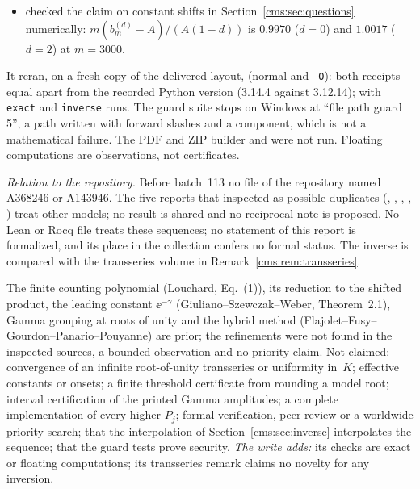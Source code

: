 \begin{writenote}
\begin{itemize}
residual tends to $-1$) and~\eqref{cms:eq:displacement} for the model $B_3$
($(r_3-X-\frac12)X\log X\to\frac1{24}$), and the monotone quadratic convergence
of~\eqref{cms:eq:Newton}, at $\log y=10^3,10^5,10^8$;
\item checked the claim on constant shifts in Section~\ref{cms:sec:questions}
numerically: $m(b^{(d)}_m-A)/(A(1-d))$ is $0.9970$ ($d=0$) and $1.0017$
($d=2$) at $m=3000$.
\end{itemize}
It reran, on a fresh copy of the delivered layout,  (normal
and \texttt{-O}): both receipts equal  apart from the
recorded Python version (3.14.4 against 3.12.14);  with
\texttt{exact} and \texttt{inverse} runs. The guard suite  stops on Windows
at ``file path guard 5'', a path written with forward slashes and a
 component, which is not a mathematical failure. The PDF and ZIP
builder and  were not run. Floating computations are
observations, not certificates.

\emph{Relation to the repository.} Before batch~113 no file of the repository
named A368246 or A143946. The five reports that  inspected as
possible duplicates (,
,
,
,
) treat other models; no result is
shared and no reciprocal note is proposed. No Lean or Rocq file treats these
sequences; no statement of this report is formalized, and its place in the
collection confers no formal status. The inverse is compared with the
transseries volume in Remark~\ref{cms:rem:transseries}.
\end{writenote}
\begin{writenote}
The finite counting polynomial (Louchard, Eq.~(1)), its reduction to the
shifted product, the leading constant $\ee^{-\gamma}$ (Giuliano--Szewczak--Weber,
Theorem~2.1), Gamma grouping at roots of unity and the hybrid method
(Flajolet--Fusy--Gourdon--Panario--Pouyanne) are prior; the refinements were
not found in the inspected sources, a bounded observation and no priority
claim. Not claimed: convergence of an infinite root-of-unity transseries or
uniformity in~$K$; effective constants or onsets; a finite threshold
certificate from rounding a model root; interval certification of the printed
Gamma amplitudes; a complete implementation of every higher $P_j$; formal
verification, peer review or a worldwide priority search; that the
interpolation of Section~\ref{cms:sec:inverse} interpolates the sequence; that
the guard tests prove security. \emph{The write adds:} its checks are exact or
floating computations; its transseries remark claims no novelty for any
inversion.
\end{writenote}
